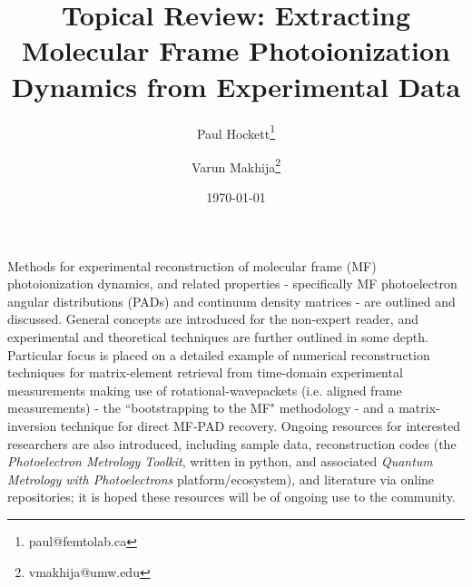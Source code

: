 \documentclass[10pt]{article}
\renewenvironment{abstract}
  {{\bfseries\noindent{\abstractname}\par\nobreak}\footnotesize}
  {\bigskip}
\begin{document}
\title{%
Topical Review: Extracting Molecular Frame Photoionization Dynamics from Experimental Data
}

\author[1]{Paul Hockett\thanks{paul@femtolab.ca} }%
\author[2]{Varun Makhija\thanks{vmakhija@umw.edu} }
%
%

\vspace{-1em}

\date{\today}


\begingroup
\let\center\flushleft
\let\endcenter\endflushleft
\maketitle
\endgroup

\begin{abstract}Methods for experimental reconstruction of molecular frame (MF) photoionization dynamics, and related properties - specifically MF photoelectron angular distributions (PADs) and continuum density matrices - are outlined and discussed. General concepts are introduced for the non-expert reader, and experimental and theoretical techniques are further outlined in some depth. Particular focus is placed on a detailed example of numerical reconstruction techniques for matrix-element retrieval from time-domain experimental measurements making use of rotational-wavepackets (i.e. aligned frame measurements) - the ``bootstrapping to the MF" methodology - and a matrix-inversion technique for direct MF-PAD recovery. Ongoing resources for interested researchers are also introduced, including sample data, reconstruction codes (the \textit{Photoelectron Metrology Toolkit}, written in python, and associated \textit{Quantum Metrology with Photoelectrons} platform/ecosystem), and literature via online repositories; it is hoped these resources will be of ongoing use to the community.\end{abstract}
\tableofcontents


\end{document}
